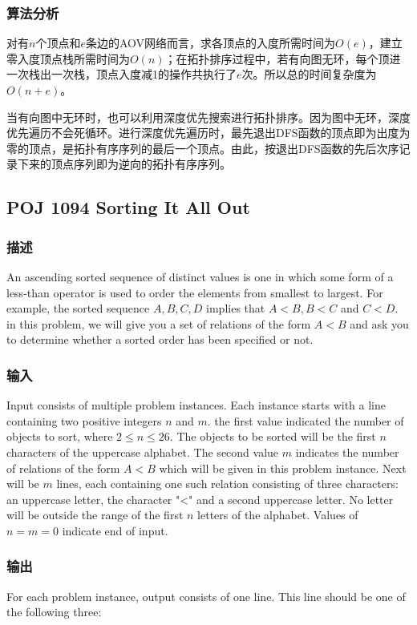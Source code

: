 \subsubsection{算法分析}
对有$n$个顶点和$e$条边的AOV网络而言，求各顶点的入度所需时间为$O(e)$，建立零入度顶点栈所需时间为$O(n)$；在拓扑排序过程中，若有向图无环，每个顶进一次栈出一次栈，顶点入度减1的操作共执行了$e$次。所以总的时间复杂度为$O(n+e)$。

当有向图中无环时，也可以利用深度优先搜索进行拓扑排序。因为图中无环，深度优先遍历不会死循环。进行深度优先遍历时，最先退出DFS函数的顶点即为出度为零的顶点，是拓扑有序序列的最后一个顶点。由此，按退出DFS函数的先后次序记录下来的顶点序列即为逆向的拓扑有序序列。


\subsection{POJ 1094 Sorting It All Out}
\subsubsection{描述}
An ascending sorted sequence of distinct values is one in which some form of a less-than operator is used to order the elements from smallest to largest. For example, the sorted sequence $A, B, C, D$ implies that $A < B, B < C$ and $C < D$. in this problem, we will give you a set of relations of the form $A < B$ and ask you to determine whether a sorted order has been specified or not.

\subsubsection{输入}
Input consists of multiple problem instances. Each instance starts with a line containing two positive integers $n$ and $m$. the first value indicated the number of objects to sort, where $2 \leq n \leq 26$. The objects to be sorted will be the first $n$ characters of the uppercase alphabet. The second value $m$ indicates the number of relations of the form $A < B$ which will be given in this problem instance. Next will be $m$ lines, each containing one such relation consisting of three characters: an uppercase letter, the character "<" and a second uppercase letter. No letter will be outside the range of the first $n$ letters of the alphabet. Values of $n = m = 0$ indicate end of input.

\subsubsection{输出}
For each problem instance, output consists of one line. This line should be one of the following three: 


